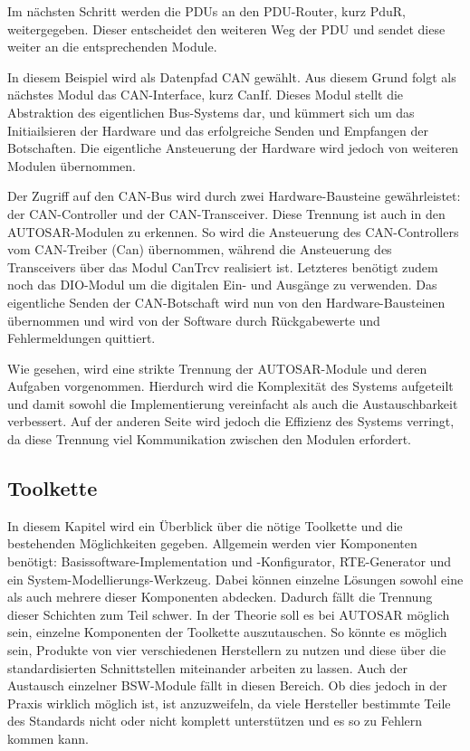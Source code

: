 \documentclass[
  a4paper,					    %
  twoside,
  DIV=calc,     				%
  bibliography=totoc,
  cleardoublepage=empty,
  ngerman,     					%
  final       					%
]{scrbook}
\begin{document}
Im nächsten Schritt werden die PDUs an den PDU-Router, kurz PduR, weitergegeben. Dieser entscheidet den weiteren Weg der PDU und sendet diese weiter an die entsprechenden Module.

In diesem Beispiel wird als Datenpfad CAN gewählt. Aus diesem Grund folgt als nächstes Modul das CAN-Interface, kurz CanIf. Dieses Modul stellt die Abstraktion des eigentlichen Bus-Systems dar, und kümmert sich um das Initiailsieren der Hardware und das erfolgreiche Senden und Empfangen der Botschaften. Die eigentliche Ansteuerung der Hardware wird jedoch von weiteren Modulen übernommen.

Der Zugriff auf den CAN-Bus wird durch zwei Hardware-Bausteine gewährleistet: der CAN-Controller und der CAN-Transceiver. Diese Trennung ist auch in den AUTOSAR-Modulen zu erkennen. So wird die Ansteuerung des CAN-Controllers vom CAN-Treiber (Can) übernommen, während die Ansteuerung des Transceivers über das Modul CanTrcv realisiert ist. Letzteres benötigt zudem noch das DIO-Modul um die digitalen Ein- und Ausgänge zu verwenden. Das eigentliche Senden der CAN-Botschaft wird nun von den Hardware-Bausteinen übernommen und wird von der Software durch Rückgabewerte und Fehlermeldungen quittiert.

Wie gesehen, wird eine strikte Trennung der AUTOSAR-Module und deren Aufgaben vorgenommen. Hierdurch wird die Komplexität des Systems aufgeteilt und damit sowohl die Implementierung vereinfacht als auch die Austauschbarkeit verbessert. Auf der anderen Seite wird jedoch die Effizienz des Systems verringt, da diese Trennung viel Kommunikation zwischen den Modulen erfordert.


\subsection{Toolkette}
\label{sec:Toolkette}
In diesem Kapitel wird ein Überblick über die nötige Toolkette und die bestehenden Möglichkeiten gegeben. Allgemein werden vier Komponenten benötigt: Basissoftware-Implementation und -Konfigurator, RTE-Generator und ein System-Modellierungs-Werkzeug. Dabei können einzelne Lösungen sowohl eine als auch mehrere dieser Komponenten abdecken. Dadurch fällt die Trennung dieser Schichten zum Teil schwer. In der Theorie soll es bei AUTOSAR möglich sein, einzelne Komponenten der Toolkette auszutauschen. So könnte es möglich sein, Produkte von vier verschiedenen Herstellern zu nutzen und diese über die standardisierten Schnittstellen miteinander arbeiten zu lassen. Auch der Austausch einzelner BSW-Module fällt in diesen Bereich. Ob dies jedoch in der Praxis wirklich möglich ist, ist anzuzweifeln, da viele Hersteller bestimmte Teile des Standards nicht oder nicht komplett unterstützen und es so zu Fehlern kommen kann.
\end{document}
